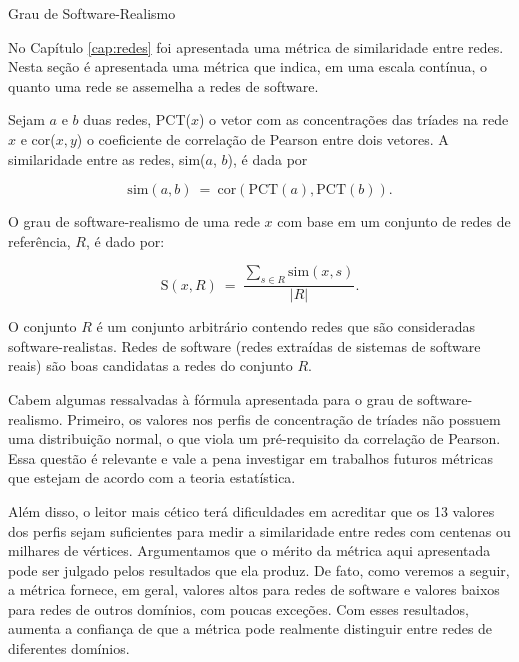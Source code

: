 \begin{section}{Grau de Software-Realismo} \label{cap:clasmetric}
	
	No Capítulo \ref{cap:redes} foi apresentada uma métrica de similaridade entre redes. Nesta seção é apresentada uma métrica que indica, em uma escala contínua, o quanto uma rede se assemelha a redes de software.
	
	Sejam $a$ e $b$ duas redes, PCT($x$) o vetor com as concentrações das tríades na rede $x$ e cor($x, y$) o coeficiente de correlação de Pearson entre dois vetores. A similaridade entre as redes, sim($a$, $b$), é dada por

	$$
	\mathrm{sim}(a, b) ~=~ 
	  \mathrm{cor}(\mathrm{PCT}(a), \mathrm{PCT}(b))\mathrm{.}
	$$
	
	O grau de software-realismo de uma rede $x$ com base em um conjunto de redes de referência, $R$, é dado por:
	
	$$
	\mathrm{S}(x, R) ~=~ \frac{
	\displaystyle\sum_{s \in R} \mathrm{sim}(x, s)
	}{|R|} \mbox{.}
	$$

	O conjunto $R$ é um conjunto arbitrário contendo redes que são consideradas software-realistas. Redes de software (redes extraídas de sistemas de software reais) são boas candidatas a redes do conjunto $R$.
	
	Cabem algumas ressalvadas à fórmula apresentada para o grau de software-realismo. Primeiro, os valores nos perfis de concentração de tríades não possuem uma distribuição normal, o que viola um pré-requisito da correlação de Pearson. Essa questão é relevante e vale a pena investigar em trabalhos futuros métricas que estejam de acordo com a teoria estatística.
	
	Além disso, o leitor mais cético terá dificuldades em acreditar que os 13 valores dos perfis sejam suficientes para medir a similaridade entre redes com centenas ou milhares de vértices. Argumentamos que o mérito da métrica aqui apresentada pode ser julgado pelos resultados que ela produz. De fato, como veremos a seguir, a métrica fornece, em geral, valores altos para redes de software e valores baixos para redes de outros domínios, com poucas exceções. Com esses resultados, aumenta a confiança de que a métrica pode realmente distinguir entre redes de diferentes domínios.
	
\end{section}
	
